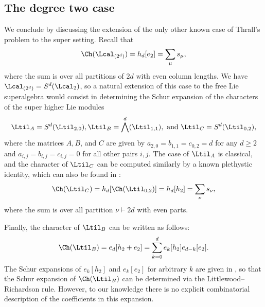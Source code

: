 \subsection{The degree two case}

We conclude by discussing the extension of the only other known case of Thrall's problem to the super setting. Recall that
\[
\Ch(\Lcal_{(2^d)}) = h_d[e_2] = \sum_\mu s_\mu,
\]
where the sum is over all partitions of $2d$ with even column lengths. We have $\Lcal_{(2^d)} = S^d(\Lcal_2)$, so a natural extension of this case to the free Lie superalgebra would consist in determining the Schur expansion of the characters of the super higher Lie modules
\[
\Ltil_A = S^d(\Ltil_{2,0}), \Ltil_B = \bigwedge^d(\Ltil_{1,1}), \text{ and } \Ltil_C = S^d(\Ltil_{0,2}),
\]
where the matrices $A,B$, and $C$ are given by $a_{2,0} = b_{1,1} = c_{0,2} = d$ for any $d \ge 2$ and $a_{i,j} = b_{i,j} = c_{i,j} = 0$ for all other pairs $i,j$. The case of $\Ltil_A$ is classical, and the character of $\Ltil_C$ can be computed similarly by a known plethystic identity, which can also be found in \cite[Ex.~I.8.6(a)]{Mac}:
\[
\Ch(\Ltil_C) = h_d[\Ch(\Ltil_{0,2})] = h_d[h_2] = \sum_{\nu} s_\nu,
\]
where the sum is over all partition $\nu \vdash 2d$ with even parts.

Finally, the character of $\Ltil_B$ can be written as follows:
\[
\Ch(\Ltil_B) = e_d[h_2+e_2] = \sum_{k = 0}^d e_k[h_2]e_{d-k}[e_2].
\]
The Schur expansions of $e_k[h_2]$ and $e_k[e_2]$ for arbitrary $k$ are given in \cite[Ex.~I.8.6(c,d)]{Mac}, so that the Schur expansion of $\Ch(\Ltil_B)$ can be determined via the Littlewood--Richardson rule. However, to our knowledge there is no explicit combinatorial description of the coefficients in this expansion.

